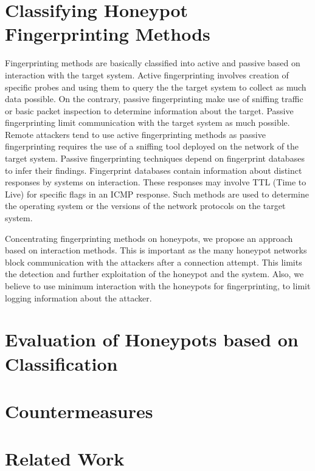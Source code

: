 \documentclass[letterpaper, 10 pt, conference]{ieeeconf}  %
\begin{document}
 \section{Classifying Honeypot Fingerprinting Methods}
   
   Fingerprinting methods are basically classified into active and passive based on interaction with the target system. Active fingerprinting involves creation of specific probes and using them to query the the target system to collect as much data possible. On the contrary, passive fingerprinting  make use of sniffing traffic or basic packet inspection to determine information about the target. Passive fingerprinting limit communication with the target system as much possible. Remote attackers tend to use active fingerprinting methods as passive fingerprinting requires the use of a sniffing tool deployed on the network of the target system. Passive fingerprinting techniques depend on fingerprint databases to infer their findings. Fingerprint databases contain information about distinct responses by systems on interaction. These responses may involve TTL (Time to Live) for specific flags in an ICMP response. Such methods are used to determine the operating system or the versions of the network protocols on the target system.
   
   Concentrating fingerprinting methods on honeypots, we propose an approach based on interaction methods. This is important as the many honeypot networks block communication with the attackers after a connection attempt. This limits the detection and further exploitation of the honeypot and the system. Also, we believe to use minimum interaction with the honeypots for fingerprinting, to limit logging information about the attacker. 


 \section{Evaluation of Honeypots based on Classification}
 
 
 
 \section {Countermeasures}
 
 
 
 \section {Related Work}
 
\end{document}
